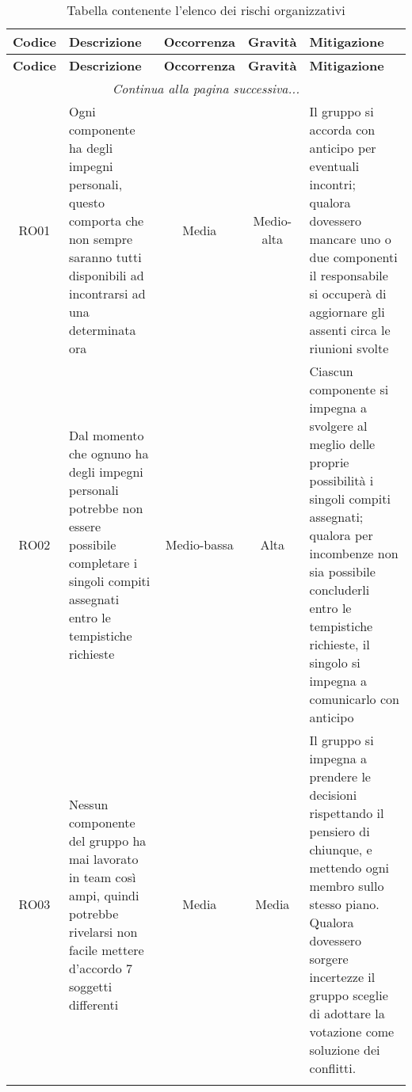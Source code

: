 \documentclass[../piano_di_progetto.tex]{subfiles}
\begin{document}
\begin{center}
	\begin{longtable}{|c|p{4.5cm}|c|c|p{4.5cm}|}
		\hline
		\rowcolor{lightgray}
		{\textbf{Codice}} & {\textbf{Descrizione}} & {\textbf{Occorrenza}} & {\textbf{Gravità}} & {\textbf{Mitigazione}}\\
		\hline

		\endfirsthead
	
		\hline
		\rowcolor{lightgray}
		{\textbf{Codice}} & {\textbf{Descrizione}} & {\textbf{Occorrenza}} & {\textbf{Gravità}} & {\textbf{Mitigazione}}\\
		\hline
		\endhead
		
		\hline
		\multicolumn{5}{|c|}{\emph{Continua alla pagina successiva...}}\\
		\hline
		\endfoot

		\endlastfoot

		RO01              &
		Ogni componente ha degli impegni personali, questo comporta che non sempre saranno tutti disponibili ad incontrarsi ad una determinata ora
		                  &
		Media
		                  &
		Medio-alta
		                  &
		Il gruppo si accorda con anticipo per eventuali incontri; qualora dovessero mancare uno o due componenti il responsabile si occuperà di aggiornare gli assenti circa le riunioni svolte                                                         \\
		RO02              &
		Dal momento che ognuno ha degli impegni personali potrebbe non essere possibile completare i singoli compiti assegnati entro le tempistiche richieste
		                  &
		Medio-bassa
		                  &
		Alta
		                  &
		Ciascun componente si impegna a svolgere al meglio delle proprie possibilità i singoli compiti assegnati; qualora per incombenze non sia possibile concluderli entro le tempistiche richieste, il singolo si impegna a comunicarlo con anticipo \\
		RO03              &
		Nessun componente del gruppo ha mai lavorato in team così ampi, quindi potrebbe rivelarsi non facile mettere d’accordo 7 soggetti differenti
		                  &
		Media
		                  &
		Media
		                  &
		Il gruppo si impegna a prendere le decisioni rispettando il pensiero di chiunque, e mettendo ogni membro sullo stesso piano. Qualora dovessero sorgere incertezze il gruppo sceglie di adottare la votazione come soluzione dei conflitti.      \\
		\hline
		\rowcolor{white}
		\caption{Tabella contenente l'elenco dei rischi organizzativi}
	\end{longtable}

\end{center}
\end{document}

